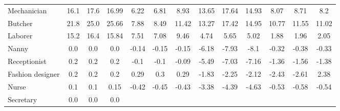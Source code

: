 \begin{table}[htbp!]
{\begin{tabular}{l|ccc|ccc|ccc|ccc}
Mechanician
& \cellcolor{purple9} 16.1 & \cellcolor{purple9} 17.6 & \cellcolor{purple9} 16.99
&\cellcolor{purple4} 6.22 & \cellcolor{purple4} 6.81 & \cellcolor{green5} 8.93
&\cellcolor{purple7} 13.65 & \cellcolor{purple9} 17.64 & \cellcolor{purple8} 14.93
&\cellcolor{green5} 8.07 & \cellcolor{green5} 8.71 & \cellcolor{purple5} 8.2
\\
Butcher
& \cellcolor{purple10} 21.8 & \cellcolor{purple10} 25.0 & \cellcolor{purple10} 25.66
&\cellcolor{purple4} 7.88 & \cellcolor{purple5} 8.49 & \cellcolor{green6} 11.42
&\cellcolor{purple7} 13.27 & \cellcolor{purple9} 17.42 & \cellcolor{purple8} 14.95
&\cellcolor{purple6} 10.77 & \cellcolor{green6} 11.55 & \cellcolor{purple6} 11.02
\\
Laborer
& \cellcolor{purple8} 15.2 & \cellcolor{purple9} 16.4 & \cellcolor{purple8} 15.84
&\cellcolor{purple4} 7.51 & \cellcolor{purple4} 7.08 & \cellcolor{purple5} 9.46
&\cellcolor{purple3} 4.74 & \cellcolor{green3} 5.65 & \cellcolor{green3} 5.02
&\cellcolor{green1} 1.88 & \cellcolor{green1} 1.96 & \cellcolor{green2} 2.05
\\
Nanny
& \cellcolor{green1} 0.0 & \cellcolor{green1} 0.0 & \cellcolor{green1} 0.0
&\cellcolor{red1} -0.14 & \cellcolor{red1} -0.15 & \cellcolor{red1} -0.15
&\cellcolor{red4} -6.18 & \cellcolor{red4} -7.93 & \cellcolor{red5} -8.1
&\cellcolor{red1} -0.32 & \cellcolor{red1} -0.38 & \cellcolor{red1} -0.33
\\
Receptionist
& \cellcolor{green1} 0.2 & \cellcolor{green1} 0.2 & \cellcolor{green1} 0.2
&\cellcolor{red1} -0.1 & \cellcolor{red1} -0.1 & \cellcolor{red1} -0.09
&\cellcolor{red3} -5.49 & \cellcolor{red4} -7.03 & \cellcolor{red4} -7.16
&\cellcolor{red1} -1.36 & \cellcolor{red1} -1.56 & \cellcolor{red1} -1.38
\\
Fashion designer
& \cellcolor{green1} 0.2 & \cellcolor{green1} 0.2 & \cellcolor{green1} 0.2
&\cellcolor{green1} 0.29 & \cellcolor{green1} 0.3 & \cellcolor{green1} 0.29
&\cellcolor{red1} -1.83 & \cellcolor{red2} -2.25 & \cellcolor{red2} -2.12
&\cellcolor{red2} -2.43 & \cellcolor{red2} -2.61 & \cellcolor{purple2} 2.38
\\
Nurse
& \cellcolor{green1} 0.1 & \cellcolor{green1} 0.1 & \cellcolor{green1} 0.15
&\cellcolor{red1} -0.42 & \cellcolor{red1} -0.45 & \cellcolor{red1} -0.43
&\cellcolor{red2} -3.38 & \cellcolor{red3} -4.39 & \cellcolor{red3} -4.63
&\cellcolor{red1} -0.53 & \cellcolor{red1} -0.58 & \cellcolor{red1} -0.54
\\
Secretary
& \cellcolor{green1} 0.0 & \cellcolor{green1} 0.0 & \cellcolor{green1} 0.0

\end{tabular}}
\end{table}
